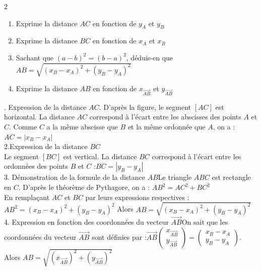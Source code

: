 \begin{multicols*}{2}
\begin{minipage}{5cm}
  		\begin{enumerate}
  			\item Exprime la distance $AC$ en fonction de $y_A$ et $y_B$
  			\item Exprime la distance $BC$ en fonction de $x_A$ et $x_B$
  			\item Sachant que $(a - b)^2 = (b - a)^2$, déduis-en que $AB = \sqrt{(x_B - x_A)^2 + (y_B - y_A)^2}$
  			\item Exprime la distance $AB$ en fonction de $x_{\overrightarrow{AB}}$ et $y_{\overrightarrow{AB}}$
  		\end{enumerate}
  	\end{minipage}
  	\dure 
  	. Expression de la distance $AC$.
  	D'après la figure, le segment $[AC]$ est horizontal. La distance $AC$ correspond à l'écart entre les abscisses des points $A$ et $C$. Comme $C$ a la même abscisse que $B$ et la même ordonnée que $A$, on a :$AC = |x_B - x_A|$
  	\\
  	2.Expression de la distance $BC$\\Le segment $[BC]$ est vertical. La distance $BC$ correspond à l'écart entre les ordonnées des points $B$ et $C$ :$BC = |y_B - y_A|$\\
  	3. Démonstration de la formule de la distance $AB$Le triangle $ABC$ est rectangle en $C$. D'après le théorème de Pythagore, on a : $AB^2 = AC^2 + BC^2$\\En remplaçant $AC$ et $BC$ par leurs expressions respectives :$AB^2 = (x_B - x_A)^2 + (y_B - y_A)^2$
  	Alors $AB = \sqrt{(x_B - x_A)^2 + (y_B - y_A)^2}$\\
  	4. Expression en fonction des coordonnées du vecteur $\overrightarrow{AB}$On sait que les coordonnées du vecteur $\overrightarrow{AB}$ sont définies par :$\overrightarrow{AB} \begin{pmatrix} x_{\overrightarrow{AB}} \\ y_{\overrightarrow{AB}} \end{pmatrix} = \begin{pmatrix} x_B - x_A \\ y_B - y_A \end{pmatrix}$.   Alors  $AB = \sqrt{(x_{\overrightarrow{AB}})^2 + (y_{\overrightarrow{AB}})^2}$
  	

\end{multicols*}
